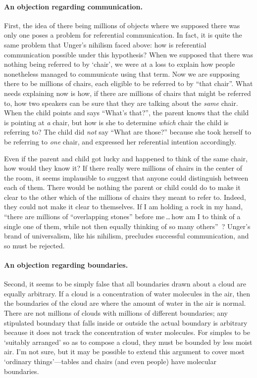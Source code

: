 \documentclass[11pt]{article}
\begin{document}
\begin{spacing}{1.5}
\paragraph{An objection regarding communication.}
First, the idea of there being millions of objects where we supposed there was only one poses a problem for referential communication. In fact, it is quite the same problem that Unger's nihilism faced above: how is referential communication possible under this hypothesis? When we supposed that there was nothing being referred to by `chair', we were at a loss to explain how people nonetheless managed to communicate using that term. Now we are supposing there to be millions of chairs, each eligible to be referred to by ``that chair''. What needs explaining now is how, if there are millions of chairs that might be referred to, how two speakers can be sure that they are talking about the {\em same} chair. When the child points and says ``What's that?'', the parent knows that the child is pointing at {\em a} chair, but how is she to determine {\em which} chair the child is referring to? The child did {\em not} say ``What are those?'' because she took herself to be referring to {\em one} chair, and expressed her referential intention accordingly.

Even if the parent and child got lucky and happened to think of the same chair, how would they know it? If there really were millions of chairs in the center of the room, it seems implausible to suggest that anyone could distinguish between each of them. There would be nothing the parent or child could do to make it clear to the other which of the millions of chairs they meant to refer to. Indeed, they could not make it clear to themselves. If I am holding a rock in my hand, ``there are millions of ``overlapping stones'' before me\,\ldots\,how am I to think of a single one of them, while not then equally thinking of so many others''~\citep[456]{unger1980a}? Unger's brand of universalism, like his nihilism, precludes successful communication, and so must be rejected.

\paragraph{An objection regarding boundaries.}
Second, it seems to be simply false that all boundaries drawn about a cloud are equally arbitrary. If a cloud is a concentration of water molecules in the air, then the boundaries of the cloud are where the amount of water in the air is normal. There are not millions of clouds with millions of different boundaries; any stipulated boundary that falls inside or outside the actual boundary is arbitrary because it does not track the concentration of water molecules. For simples to be `suitably arranged' so as to compose a cloud, they must be bounded by less moist air. I'm not sure, but it may be possible to extend this argument to cover most `ordinary things'---tables and chairs (and even people) have molecular boundaries.


\end{spacing}
\end{document}

